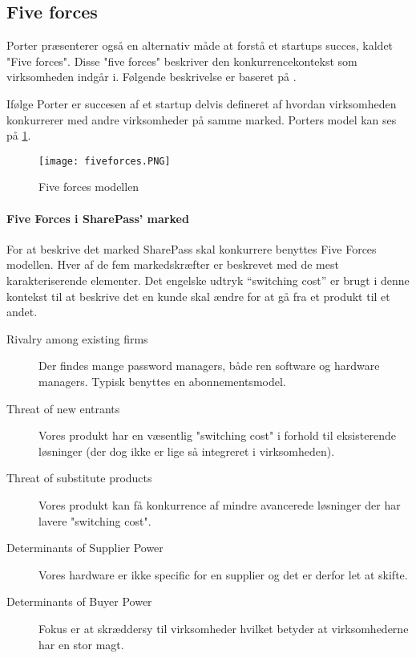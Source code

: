 \subsection{Five forces}
 Porter præsenterer også en alternativ måde at forstå et startups succes, kaldet "Five forces".
 Disse "five forces" beskriver den konkurrencekontekst som virksomheden indgår i.
 Følgende beskrivelse er baseret på \citet[p.~16]{rose2012software}.

 Ifølge Porter er succesen af et startup delvis defineret af hvordan virksomheden konkurrerer med andre virksomheder på samme marked.
 Porters model kan ses på \cref{fiveforces}.

\begin{figure}[H]
	\texttt{[image: fiveforces.PNG]}
	\caption{Five forces modellen}
	\label{fiveforces}
\end{figure}

\paragraph{Five Forces i SharePass' marked}
\label{par:five_forces_i_sharepass_marked}

For at beskrive det marked SharePass skal konkurrere benyttes Five Forces modellen. 
Hver af de fem markedskræfter er beskrevet med de mest karakteriserende elementer.
Det engelske udtryk ``switching cost'' er brugt i denne kontekst til at beskrive det en kunde skal ændre for at gå fra et produkt til et andet.

\begin{description}
	\item[Rivalry among existing firms] Der findes mange password managers, både ren software og hardware managers. Typisk benyttes en abonnementsmodel.
	\item[Threat of new entrants] Vores produkt har en væsentlig "switching cost" i forhold til eksisterende løsninger (der dog ikke er lige så integreret i virksomheden). 
	\item [Threat of substitute products] Vores produkt kan få konkurrence af mindre avancerede løsninger der har lavere "switching cost".
	\item [Determinants of Supplier Power] Vores hardware er ikke specific for en supplier og det er derfor let at skifte. 
	\item [Determinants of Buyer Power] Fokus er at skræddersy til virksomheder hvilket betyder at virksomhederne har en stor magt.
\end{description}
